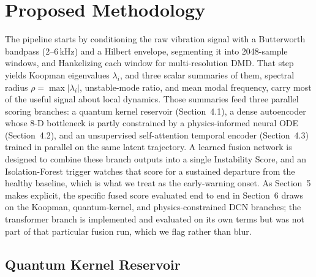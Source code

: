 \documentclass[3p,times,procedia]{elsarticle}
\begin{document}
\section{Proposed Methodology}

The pipeline starts by conditioning the raw vibration signal with a Butterworth bandpass (2--6\,kHz) and a Hilbert envelope, segmenting it into 2048-sample windows, and Hankelizing each window for multi-resolution DMD. That step yields Koopman eigenvalues $\lambda_i$, and three scalar summaries of them, spectral radius $\rho = \max|\lambda_i|$, unstable-mode ratio, and mean modal frequency, carry most of the useful signal about local dynamics. Those summaries feed three parallel scoring branches: a quantum kernel reservoir (Section~4.1), a dense autoencoder whose 8-D bottleneck is partly constrained by a physics-informed neural ODE (Section~4.2), and an unsupervised self-attention temporal encoder (Section~4.3) trained in parallel on the same latent trajectory. A learned fusion network is designed to combine these branch outputs into a single Instability Score, and an Isolation-Forest trigger \cite{liu2008} watches that score for a sustained departure from the healthy baseline, which is what we treat as the early-warning onset. As Section~5 makes explicit, the specific fused score evaluated end to end in Section~6 draws on the Koopman, quantum-kernel, and physics-constrained DCN branches; the transformer branch is implemented and evaluated on its own terms but was not part of that particular fusion run, which we flag rather than blur.

\subsection{Quantum Kernel Reservoir}
\end{document}
